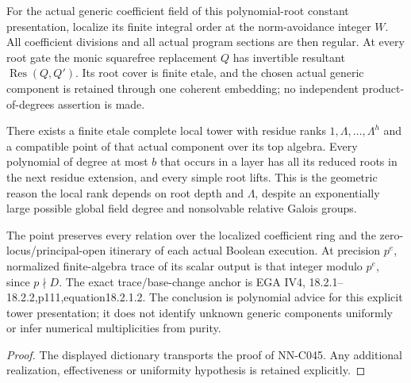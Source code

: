 \begin{geometricstatement}[NN-C045]
For the actual generic coefficient field of this polynomial-root
constant presentation, localize its finite integral order at the
norm-avoidance integer $W$. All coefficient divisions and all
actual program sections are then regular. At every root gate the
monic squarefree replacement $Q$ has invertible resultant
$\operatorname{Res}(Q,Q')$. Its root cover is finite etale, and the
chosen actual generic component is retained through one coherent
embedding; no independent product-of-degrees assertion is made.

There exists a finite etale complete local tower with residue
ranks $1,\Lambda,\ldots,\Lambda^h$ and a compatible point of that
actual component over its top algebra. Every polynomial of degree
at most $b$ that occurs in a layer has all its reduced roots in
the next residue extension, and every simple root lifts. This is
the geometric reason the local rank depends on root depth and
$\Lambda$, despite an exponentially large possible global field
degree and nonsolvable relative Galois groups.

The point preserves every relation over the localized coefficient
ring and the zero-locus/principal-open itinerary of each actual
Boolean execution. At precision $p^e$, normalized finite-algebra
trace of its scalar output is that integer modulo $p^e$, since
$p\nmid D$. The exact trace/base-change anchor is EGA IV4,
18.2.1--18.2.2,p111,equation18.2.1.2. The conclusion is polynomial
advice for this explicit tower presentation; it does not identify
unknown generic components uniformly or infer numerical
multiplicities from purity.
\end{geometricstatement}
\begin{proof} The displayed dictionary transports the proof of NN-C045. Any additional realization, effectiveness or uniformity hypothesis is retained explicitly.\end{proof}


